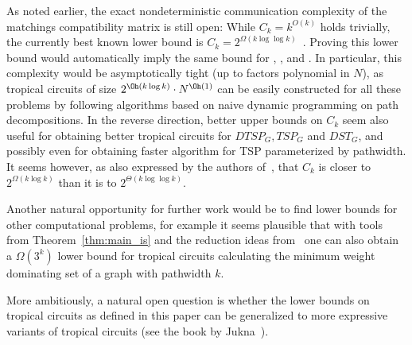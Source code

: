 As noted earlier, the exact nondeterministic communication complexity of the matchings compatibility matrix is still open: While $C_k =k^{O(k)}$ holds trivially, the currently best known lower bound is $C_k = 2^{\Omega(k \log \log k)}$~\cite{raz1995log}. 
Proving this lower bound would automatically imply the same bound for , , and . In particular, this complexity would be asymptotically tight (up to factors polynomial in $N$), as tropical circuits of size $2^{\Oh(k \log k)} \cdot N^{\Oh(1)}$ can be easily constructed for all these problems by following algorithms based on naive dynamic programming on path decompositions.
In the reverse direction, better upper bounds on $C_k$ seem also useful for obtaining better tropical circuits for $DTSP_G,TSP_G$ and $DST_G$, and possibly even for obtaining faster algorithm for TSP parameterized by pathwidth. It seems however, as also expressed by the authors of~\cite{raz1995log}, that $C_k$ is closer to $2^{\Omega(k \log k)}$ than it is to $2^{\Theta(k \log \log k)}$.


Another natural opportunity for further work would be to find lower bounds for other computational problems, for example it seems plausible that with tools from Theorem~\ref{thm:main_is} and the reduction ideas from~\cite{LokshtanovMS18b} one can also obtain a $\Omega(3^k)$ lower bound for tropical circuits calculating the minimum weight dominating set of a graph with pathwidth $k$.

More ambitiously, a natural open question is whether the lower bounds on tropical circuits as defined in this paper can be generalized to more expressive variants of tropical circuits (see the book by Jukna~\cite{Jukna2023}).

